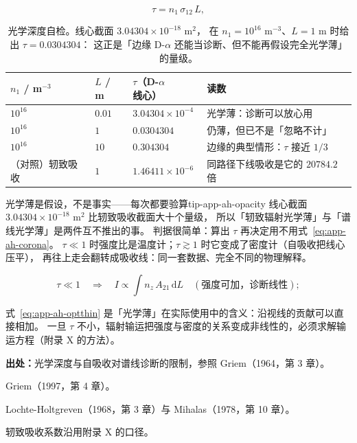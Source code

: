 \begin{equation}
\tau = n_1\,\sigma_{12}\,L,
\label{eq:app-ah-tau}
\end{equation}

\begin{table}[htbp]
\centering
\small
\caption{光学深度自检。线心截面 $3.04304\times10^{-18}$ m$^2$，
在 $n_1=10^{16}$ m$^{-3}$、$L=1$ m 时给出 $\tau=0.0304304$：
这正是「边缘 D-$\alpha$ 还能当诊断、但不能再假设完全光学薄」的量级。}
\label{tab:app-ah-opacity}
\begin{tabular}{p{2.5cm}p{1.9cm}p{2.5cm}p{4.8cm}}
\toprule
$n_1$ / m$^{-3}$ & $L$ / m & $\tau$（D-$\alpha$ 线心） & 读数 \\
\midrule
$10^{16}$ & $0.01$ & $3.04304\times10^{-4}$ & 光学薄：诊断可以放心用 \\
$10^{16}$ & $1$ & $0.0304304$ & 仍薄，但已不是「忽略不计」 \\
$10^{16}$ & $10$ & $0.304304$ & 边缘的典型情形：$\tau$ 接近 $1/3$ \\
\midrule
（对照）轫致吸收 & $1$ & $1.46411\times10^{-6}$ & 同路径下线吸收是它的 $20784.2$ 倍 \\
\bottomrule
\end{tabular}

\end{table}

\begin{tip}{光学薄是假设，不是事实——每次都要验算}{tip-app-ah-opacity}
线心截面 $3.04304\times10^{-18}$ m$^2$ 比轫致吸收截面大十个量级，
所以「轫致辐射光学薄」与「谱线光学薄」是两件互不推出的事。
判据很简单：算出 $\tau$ 再决定用不用式~\eqref{eq:app-ah-corona}。
$\tau\ll1$ 时强度比是温度计；$\tau\gtrsim1$ 时它变成了密度计（自吸收把线心压平），
再往上走会翻转成吸收线：同一套数据、完全不同的物理解释。
\end{tip}

\begin{equation}
\tau \ll 1 \quad\Longrightarrow\quad
I \propto \int n_z\,A_{21}\,\mathrm{d}L \quad(\text{强度可加，诊断线性});
\label{eq:app-ah-optthin}
\end{equation}

式~\eqref{eq:app-ah-optthin} 是「光学薄」在实际使用中的含义：沿视线的贡献可以直接相加。
一旦 $\tau$ 不小，辐射输运把强度与密度的关系变成非线性的，必须求解输运方程（附录 X 的方法）。

{\footnotesize
\textbf{出处：}光学深度与自吸收对谱线诊断的限制，参照 Griem（1964，第 3 章）。

Griem（1997，第 4 章）。

Lochte-Holtgreven（1968，第 3 章）与 Mihalas（1978，第 10 章）。

轫致吸收系数沿用附录 X 的口径。
}

